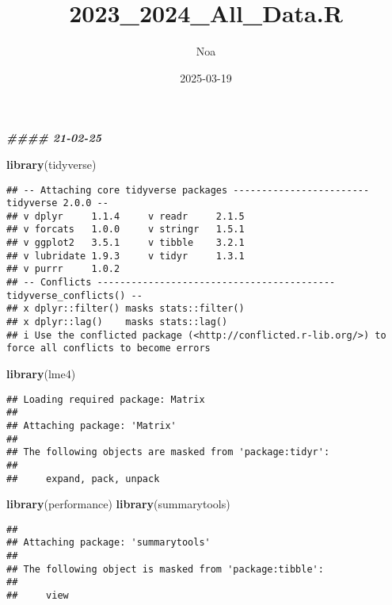 \documentclass[
]{article}
\title{2023\_2024\_All\_Data.R}
\author{Noa}
\date{2025-03-19}
\newenvironment{Shaded}{\begin{snugshade}}{\end{snugshade}}
\newcommand{\DocumentationTok}[1]{\textcolor[rgb]{0.56,0.35,0.01}{\textbf{\textit{#1}}}}
\newcommand{\FunctionTok}[1]{\textcolor[rgb]{0.13,0.29,0.53}{\textbf{#1}}}
\newcommand{\NormalTok}[1]{#1}
\begin{document}
\maketitle

\begin{Shaded}
\begin{Highlighting}[]
\DocumentationTok{\#\#\#\# 21{-}02{-}25}

\FunctionTok{library}\NormalTok{(tidyverse)}
\end{Highlighting}
\end{Shaded}

\begin{verbatim}
## -- Attaching core tidyverse packages ------------------------ tidyverse 2.0.0 --
## v dplyr     1.1.4     v readr     2.1.5
## v forcats   1.0.0     v stringr   1.5.1
## v ggplot2   3.5.1     v tibble    3.2.1
## v lubridate 1.9.3     v tidyr     1.3.1
## v purrr     1.0.2     
## -- Conflicts ------------------------------------------ tidyverse_conflicts() --
## x dplyr::filter() masks stats::filter()
## x dplyr::lag()    masks stats::lag()
## i Use the conflicted package (<http://conflicted.r-lib.org/>) to force all conflicts to become errors
\end{verbatim}

\begin{Shaded}
\begin{Highlighting}[]
\FunctionTok{library}\NormalTok{(lme4)}
\end{Highlighting}
\end{Shaded}

\begin{verbatim}
## Loading required package: Matrix
## 
## Attaching package: 'Matrix'
## 
## The following objects are masked from 'package:tidyr':
## 
##     expand, pack, unpack
\end{verbatim}

\begin{Shaded}
\begin{Highlighting}[]
\FunctionTok{library}\NormalTok{(performance)}
\FunctionTok{library}\NormalTok{(summarytools)}
\end{Highlighting}
\end{Shaded}

\begin{verbatim}
## 
## Attaching package: 'summarytools'
## 
## The following object is masked from 'package:tibble':
## 
##     view
\end{verbatim}
\end{document}
